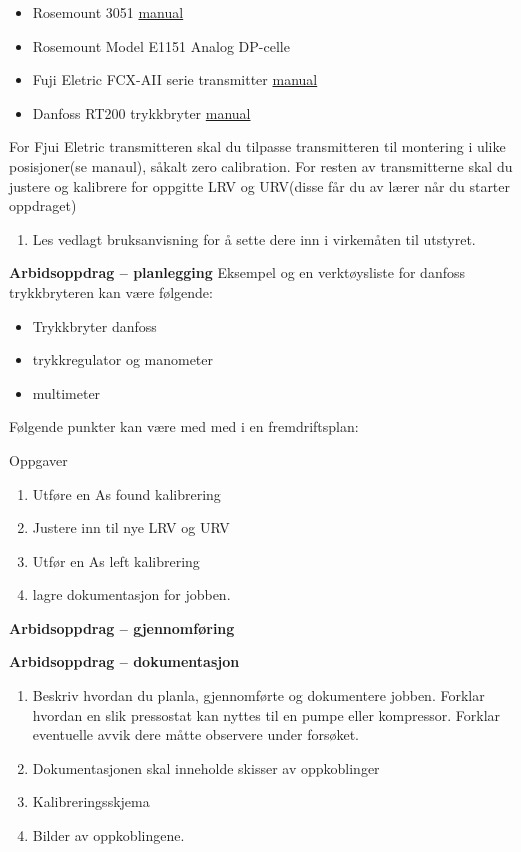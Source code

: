\begin{itemize}[noitemsep]
	\item Rosemount 3051 \href{https://www.emerson.com/documents/automation/reference-manual-rosemount-3051-pressure-transmitter-hart-r-protocol-en-89452.pdf}{manual}
	\item Rosemount Model E1151 Analog DP-celle
	\item Fuji Eletric FCX-AII serie transmitter \href {https://www.instrumart.com/assets/Fuji-FCX-manual.pdf}{manual}
	\item Danfoss RT200 trykkbryter \href{https://assets.danfoss.com/documents/149203/AN17908643810101-000501.pdf}{manual}
\end{itemize}


For Fjui Eletric transmitteren skal du tilpasse transmitteren til montering i ulike posisjoner(se manaul), såkalt zero calibration. For resten av transmitterne skal du justere og kalibrere for oppgitte LRV og URV(disse får du av lærer når du starter oppdraget)




\begin{enumerate}
	\item Les vedlagt bruksanvisning for å sette dere inn i virkemåten til utstyret.
\end{enumerate}
\textbf{Arbidsoppdrag -- planlegging}
Eksempel og en verktøysliste for danfoss trykkbryteren kan være følgende:

\vskip 5pt 
\begin{itemize}[noitemsep]
	\item Trykkbryter danfoss
	\item trykkregulator og manometer
	\item multimeter
\end{itemize}

Følgende punkter kan være med med i en fremdriftsplan:

Oppgaver\begin{enumerate}
	\item Utføre en As found kalibrering 
	\item Justere inn til nye LRV og URV
	\item Utfør en As left kalibrering 
	\item lagre dokumentasjon for jobben.
\end{enumerate}
\textbf{Arbidsoppdrag -- gjennomføring}

\textbf{Arbidsoppdrag -- dokumentasjon}

\begin{enumerate}
	\item Beskriv hvordan du planla, gjennomførte og dokumentere jobben. Forklar hvordan en slik pressostat kan nyttes til en pumpe eller kompressor. Forklar eventuelle avvik dere måtte observere under forsøket. 
	\item Dokumentasjonen skal inneholde skisser av oppkoblinger 
	\item Kalibreringsskjema
	\item Bilder av oppkoblingene. 
\end{enumerate}






